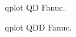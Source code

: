 \documentclass[a4paper,12pt]{article}
\begin{document}
\begin{figure}[H]
    \centering
    \begin{adjustbox}{scale = 0.65, max width=\columnwidth}
    \end{adjustbox}
    \caption{qplot QD Fanuc.}
    \label{qplot QD fanuc}
\end{figure}
\begin{figure}[H]
    \centering
    \begin{adjustbox}{scale = 0.65, max width=\columnwidth}
    \end{adjustbox}
    \caption{qplot QDD Fanuc.}
    \label{qplot QDD fanuc}
\end{figure}
\end{document}
